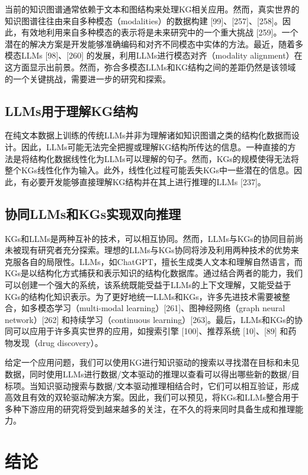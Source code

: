 当前的知识图谱通常依赖于文本和图结构来处理KG相关应用。然而，真实世界的知识图谱往往由来自多种模态（modalities）的数据构建 [99]、[257]、[258]。因此，有效地利用来自多种模态的表示将是未来研究中的一个重大挑战 [259]。一个潜在的解决方案是开发能够准确编码和对齐不同模态中实体的方法。最近，随着多模态LLMs [98]、[260] 的发展，利用LLMs进行模态对齐（modality alignment）在这方面显示出前景。然而，弥合多模态LLMs和KG结构之间的差距仍然是该领域的一个关键挑战，需要进一步的研究和探索。

\subsection{LLMs用于理解KG结构}

在纯文本数据上训练的传统LLMs并非为理解诸如知识图谱之类的结构化数据而设计。因此，LLMs可能无法完全把握或理解KG结构所传达的信息。一种直接的方法是将结构化数据线性化为LLMs可以理解的句子。然而，KGs的规模使得无法将整个KGs线性化作为输入。此外，线性化过程可能丢失KGs中一些潜在的信息。因此，有必要开发能够直接理解KG结构并在其上进行推理的LLMs [237]。

\subsection{协同LLMs和KGs实现双向推理}

KGs和LLMs是两种互补的技术，可以相互协同。然而，LLMs与KGs的协同目前尚未被现有研究者充分探索。理想的LLMs与KGs协同将涉及利用两种技术的优势来克服各自的局限性。LLMs，如ChatGPT，擅长生成类人文本和理解自然语言，而KGs是以结构化方式捕获和表示知识的结构化数据库。通过结合两者的能力，我们可以创建一个强大的系统，该系统既能受益于LLMs的上下文理解，又能受益于KGs的结构化知识表示。为了更好地统一LLMs和KGs，许多先进技术需要被整合，如多模态学习（multi-modal learning）[261]、图神经网络（graph neural network）[262] 和持续学习（continuous learning）[263]。最后，LLMs和KGs的协同可以应用于许多真实世界的应用，如搜索引擎 [100]、推荐系统 [10]、[89] 和药物发现（drug discovery）。

给定一个应用问题，我们可以使用KG进行知识驱动的搜索以寻找潜在目标和未见数据，同时使用LLMs进行数据/文本驱动的推理以查看可以得出哪些新的数据/目标项。当知识驱动搜索与数据/文本驱动推理相结合时，它们可以相互验证，形成高效且有效的双轮驱动解决方案。因此，我们可以预见，将KGs和LLMs整合用于多种下游应用的研究将受到越来越多的关注，在不久的将来同时具备生成和推理能力。

\section{结论}

